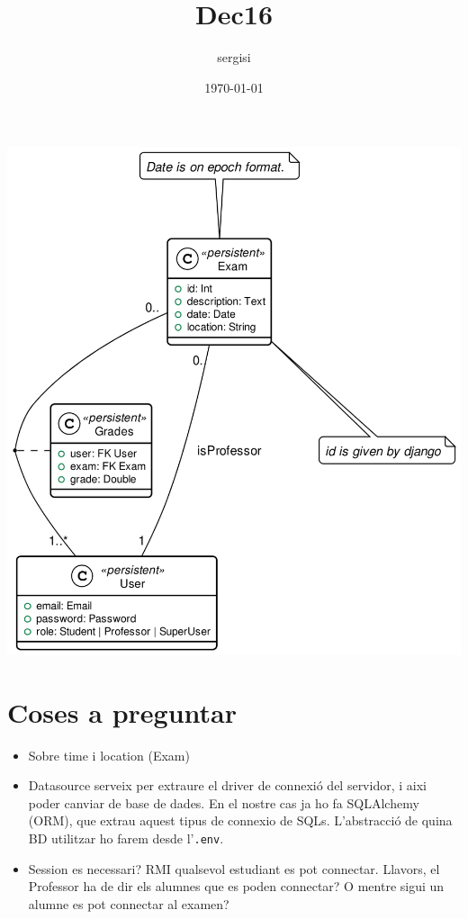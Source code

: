 \documentclass[11pt]{article}
\author{sergisi}
\date{\today}
\title{Dec16}
\begin{document}
\maketitle
\tableofcontents

\begin{center}
\includegraphics[width=.9\linewidth]{img/message_passing.png}
\end{center}

\section{Coses a preguntar}
\label{sec:org8ea9842}
\begin{itemize}
\item Sobre time i location (Exam)
\item Datasource serveix per extraure el driver de connexió del servidor, i
aixi poder canviar de base de dades. En el nostre cas ja ho fa SQLAlchemy
(ORM), que extrau aquest tipus de connexio de SQLs. L'abstracció de quina
BD utilitzar ho farem desde l'\texttt{.env}.
\item Session es necessari? RMI qualsevol estudiant es pot connectar. Llavors,
el Professor ha de dir els alumnes que es poden connectar? O mentre sigui
un alumne es pot connectar al examen?
\end{itemize}
\end{document}

